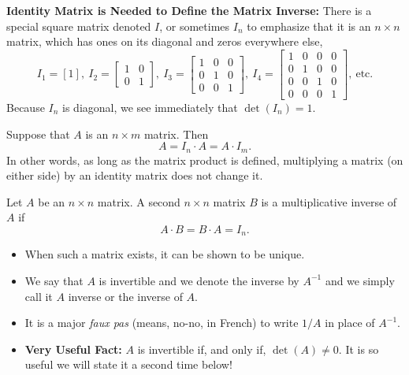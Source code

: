 \documentclass[letterpaper]{book}
\begin{document}
\vspace*{1cm}

{\bf \large Identity Matrix is Needed to Define the Matrix Inverse:} 
There is a special square matrix denoted $I$, or sometimes $I_n$ to emphasize that it is an $n \times n $ matrix, which has ones on its diagonal and zeros everywhere else,
$$I_1=[1],~I_2=\begin{bmatrix} 1 & 0\\0& 1 \end{bmatrix},~I_3= \begin{bmatrix} 1 & 0 & 0\\0& 1 & 0\\ 0 & 0 & 1 \end{bmatrix}, ~I_4=\begin{bmatrix} 1 & 0 & 0 & 0\\0& 1 & 0 & 0\\ 0 & 0 & 1 & 0 \\ 0 & 0& 0& 1\end{bmatrix}, ~\text{etc.} $$ 
Because $I_n$ is diagonal, we see immediately that $\det(I_n)=1$.

\begin{tcolorbox}[title=\textbf{\large Multiplication by the Identity Matrix}]
Suppose that $A$ is an $n \times m$ matrix. Then 
$$A = I_n \cdot A = A \cdot I_m. $$
In other words, as long as the matrix product is defined, multiplying a matrix (on either side) by an identity matrix does not change it. 
\end{tcolorbox}

\vspace*{1cm}

\begin{tcolorbox}[sharp corners, colback=green!30, colframe=green!80!blue, title=\textbf{\large The Inverse of a Square Matrix}]
 Let $A$ be an $n \times n$ matrix. A second $n \times n$ matrix $B$ is a multiplicative inverse of $A$ if
 $$A \cdot B = B \cdot A = I_n. $$
 \begin{itemize}
     \item When such a matrix exists, it can be shown to be unique.
     \item We say that $A$ is invertible and we denote the inverse by $A^{-1}$ and we simply call it $A$ inverse or the inverse of $A$.
     \item It is a major \textit{faux pas} (means, no-no, in French) to write $1/A$ in place of $A^{-1}$.
     \item \textbf{Very Useful Fact:} $A$ is invertible if, and only if, $\det(A) \neq 0$. It is so useful we will state it a second time below!
 \end{itemize}
\end{tcolorbox}
\vspace*{1cm}
\end{document}
